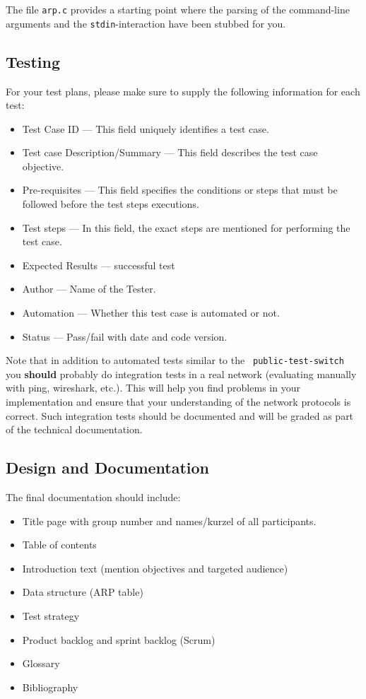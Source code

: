 \documentclass{article}
\begin{document}
The file {\tt arp.c} provides a starting point where the parsing of
the command-line arguments and the {\tt stdin}-interaction have been
stubbed for you.


\subsection{Testing}

For your test plans, please make sure to supply the
following information for each test:

\begin{itemize}
  \item Test Case ID --- This field uniquely identifies a test case.
  \item Test case Description/Summary --- This field describes the test case objective.
  \item Pre-requisites --- This field specifies the conditions or steps that must be followed before the test steps executions.
  \item Test steps --- In this field, the exact steps are mentioned for performing the test case.
  \item Expected Results --- successful test
  \item Author --- Name of the Tester.
  \item Automation --- Whether this test case is automated or not.
  \item Status --- Pass/fail with date and code version.
\end{itemize}

Note that in addition to automated tests similar to the {\tt
  public-test-switch} you {\bf should} probably do integration tests
in a real network (evaluating manually with ping, wireshark, etc.).
This will help you find problems in your implementation and ensure
that your understanding of the network protocols is correct. Such
integration tests should be documented and will be graded as part of
the technical documentation.


\subsection{Design and Documentation}

The final documentation should include:
  \begin{itemize}
  \item Title page with group number and names/kurzel of all participants.
  \item Table of contents
  \item Introduction text (mention objectives and targeted audience)
  \item Data structure (ARP table)
  \item Test strategy
  \item Product backlog and sprint backlog (Scrum)
  \item Glossary
  \item Bibliography
\end{itemize}
\end{document}
